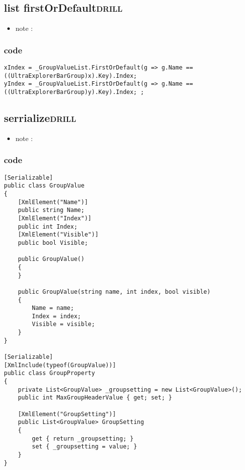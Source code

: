 \documentclass[11pt]{article}
\begin{document}
\subsection{list firstOrDefault\hfill{}\textsc{drill}}
\label{sec:org83e259f}
\begin{itemize}
\item note :
\end{itemize}
\subsubsection{code}
\label{sec:orga8ca8d1}
\begin{verbatim}
xIndex = _GroupValueList.FirstOrDefault(g => g.Name == ((UltraExplorerBarGroup)x).Key).Index;
yIndex = _GroupValueList.FirstOrDefault(g => g.Name == ((UltraExplorerBarGroup)y).Key).Index; ;

\end{verbatim}

\subsection{serrialize\hfill{}\textsc{drill}}
\label{sec:org43e3967}
\begin{itemize}
\item note :
\end{itemize}
\subsubsection{code}
\label{sec:orgde68976}
\begin{verbatim}
[Serializable]
public class GroupValue
{
    [XmlElement("Name")]
    public string Name;
    [XmlElement("Index")]
    public int Index;
    [XmlElement("Visible")]
    public bool Visible;

    public GroupValue()
    {
    }

    public GroupValue(string name, int index, bool visible)
    {
        Name = name;
        Index = index;
        Visible = visible;
    }
}

[Serializable]
[XmlInclude(typeof(GroupValue))]
public class GroupProperty
{
    private List<GroupValue> _groupsetting = new List<GroupValue>();
    public int MaxGroupHeaderValue { get; set; }

    [XmlElement("GroupSetting")]
    public List<GroupValue> GroupSetting
    {
        get { return _groupsetting; }
        set { _groupsetting = value; }
    }
}

\end{verbatim}
\end{document}
